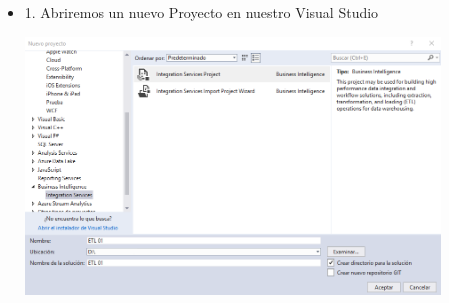 \begin{itemize}
\item 1. Abriremos un nuevo Proyecto en nuestro Visual Studio\\
	\begin{center}
	\includegraphics[width=11cm]{./Imagenes/img13}
	\end{center}	


\end{itemize}
